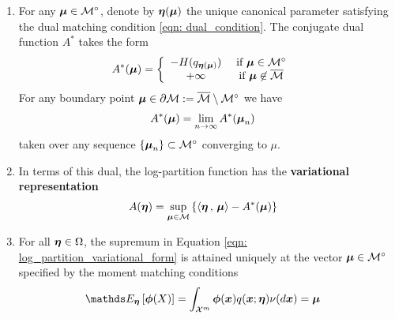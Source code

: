 \documentclass[11pt]{article}
\begin{document}
\begin{theorem}\label{theorem: dual_A} \citep{wainwright2008graphical}
\begin{enumerate}
\item For any $\boldsymbol{\mu} \in {\mathcal M}^{\circ}$, denote by $\boldsymbol{\eta}(\boldsymbol{\mu})$ the unique canonical parameter satisfying the dual matching condition \eqref{eqn: dual_condition}. The conjugate dual function $A^{*}$ takes the form
\begin{align}
A^{*}(\boldsymbol{\mu}) &= \left\{\begin{array}{cc}
 -H(q_{\boldsymbol{\eta}(\boldsymbol{\mu})}) & \text{ if }\boldsymbol{\mu} \in {\mathcal M}^{\circ}\\
+\infty & \text{ if }\boldsymbol{\mu} \not\in \overline{{\mathcal M}}
\end{array} \right. \label{eqn: conjugate_dual_partition_neg_ent}
\end{align}
For any boundary point $\boldsymbol{\mu} \in  \partial {\mathcal M} := \overline{{\mathcal M}} \setminus {\mathcal M}^{\circ}$ we have
\begin{align}
A^{*}(\boldsymbol{\mu}) &= \lim_{n\rightarrow \infty} A^{*}(\boldsymbol{\mu}_{n})
\end{align} taken over any sequence $\{\boldsymbol{\mu}_n\} \subset {\mathcal M}^{\circ}$ converging to $\mu$.

\item In terms of this dual, the log-partition function has the \textbf{variational representation}
\begin{align}
A(\boldsymbol{\eta}) &=  \sup_{\boldsymbol{\mu} \in {\mathcal M}}\left\{ \left\langle \boldsymbol{\eta}\,,\, \boldsymbol{\mu} \right\rangle - A^{*}(\boldsymbol{\mu})\right\} \label{eqn: log_partition_variational_form}
\end{align}

\item For all $\boldsymbol{\eta} \in \Omega$, the supremum in Equation \eqref{eqn: log_partition_variational_form} is attained uniquely at the vector $\boldsymbol{\mu} \in {\mathcal M}^{\circ}$ specified by the moment matching conditions
\begin{align}
\E{\mb{\eta}}{\mb{\phi}(X)} &= \int_{\cX^{m}} \mb{\phi}(\mb{x}) q(\mb{x};\mb{\eta})\nu(d\mb{x}) = \mb{\mu} \label{eqn: dual_condition}
\end{align} 
\end{enumerate}
\end{theorem}
\end{document}
